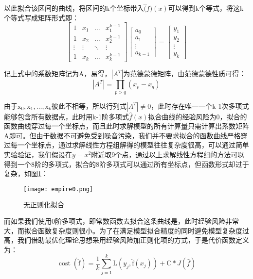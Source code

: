 以此拟合该区间的曲线，将区间的k个坐标带入$\hat(f)(x)$可以得到k个等式，将这k个等式写成矩阵形式即：
\[
\left[\begin{array}{cccc}
{1} & {x_{1}} & {\dots} & {x_{1}^{k-1}} \\
{1} & {x_{2}} & {\dots} & {x_{2}^{k-1}} \\
{\vdots} & {\vdots} & {\ddots} & {\vdots} \\
{1} & {x_{k}} & {\dots} & {x_{k}^{k-1}}
\end{array}\right]\left[\begin{array}{c}
{a_{0}} \\
{a_{1}} \\
{\vdots} \\
{a_{k-1}}
\end{array}\right]=\left[\begin{array}{c}
{y_{1}} \\
{y_{2}} \\
{\vdots} \\
{y_{k}}
\end{array}\right]
\]

记上式中的系数矩阵记为A，易得，$|A^T|$为范德蒙德矩阵，由范德蒙德性质可得：
\[
\left|A^{T}\right|=\prod_{p>q}\left(x_{p}-x_{q}\right)
\]

由于$\mathrm{x}_{0}, \mathrm{x}_{1}, \dots, \mathrm{x}_{k}$彼此不相等，所以行列式$|A^T| \ne 0$，此时存在唯一一个k-1次多项式能够包含所有数据点，此时用k-1阶多项式$\hat{f}(x)$拟合曲线的经验风险为0，拟合的函数曲线穿过每一个坐标点，而且此时求解模型的所有计算量只需计算出系数矩阵A即可。但由于数据不可避免受到噪音污染，我们并不要求拟合的函数曲线严格穿过每一个坐标点，通过求解线性方程组解得的模型往往复杂度很高，可以通过简单实验验证，我们假设在$y=x^2$附近取9个点，通过以上求解线性方程组的方法可以得到一个8阶的多项式，拟合的8阶多项式可以通过所有坐标点，但函数形式却过于复杂，如图\ref{empire0}：
\begin{figure}[h]
	\texttt{[image: empire0.png]}
	\caption{无正则化拟合}
	\label{empire0}
\end{figure}

而如果我们使用0阶多项式，即常数函数去拟合这条曲线是，此时经验风险非常大，而拟合函数复杂度则很小。为了在满足模型拟合精度的同时避免模型复杂度过高，我们借助最优化理论思想采用经验风险加正则化项的方式，于是代价函数定义为：
\begin{equation}
\label{ch3costL1}
\operatorname{cost}(\mathrm{\hat{f}})=\frac{1}{k} \sum_{j=1}^{k} \mathrm{L}\left(y_{j}, \mathrm{\hat{f}}\left(x_{j}\right)\right)+\mathrm{C} * J(\hat{f})
\end{equation}

